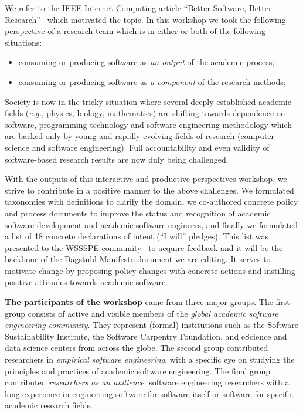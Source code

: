 \documentclass[a4paper,UKenglish]{dagrep}
\newcommand{\eg}{\emph{e.g.},\xspace}
\begin{document}
We refer to the IEEE Internet Computing article ``Better Software, Better Research''~\cite{Goble2014} which motivated the topic. In this workshop we took the following perspective of a research team which is in either or both of the following situations:
\begin{itemize}
\item consuming or producing software as \emph{an output} of the academic process;
\item consuming or producing software as \emph{a component} of the research methods;
\end{itemize}

Society is now in the tricky situation where several deeply established academic fields
(\eg physics, biology, mathematics) are shifting towards dependence on software, programming technology and software engineering methodology
which are backed only by young and rapidly evolving fields of research (computer science and software engineering).  Full accountability and even validity of software-based research results are now duly being challenged.

With the outputs of this interactive and productive perspectives workshop, we strive to contribute in a positive manner to the above challenges. We formulated taxonomies with definitions to clarify the domain, we co-authored concrete policy and process documents to improve the status and recognition of academic software development and academic software engineers, and finally we formulated a list of 18 concrete declarations of intent (``I will'' pledges). This list was presented to the WSSSPE community~\cite{wssspe_manifesto} to acquire feedback and it will be the backbone of the Dagstuhl Manifesto document we are editing. It serves to motivate change by proposing policy changes with concrete actions and instilling positive attitudes towards academic software.


\textbf{The participants of the workshop} came from three major groups. The first group consists of active and visible members of the \emph{global academic software engineering community}. They represent (formal) institutions such as the Software Sustainability Institute, the Software Carpentry Foundation, and eScience and data science centers from across the globe. The second group contributed researchers in \emph{empirical software engineering}, with a specific eye on studying the principles and practices of academic software engineering. The final group contributed \emph{researchers as an audience}: software engineering researchers with a long experience in engineering software for software itself or software for specific academic research fields.
\end{document}
